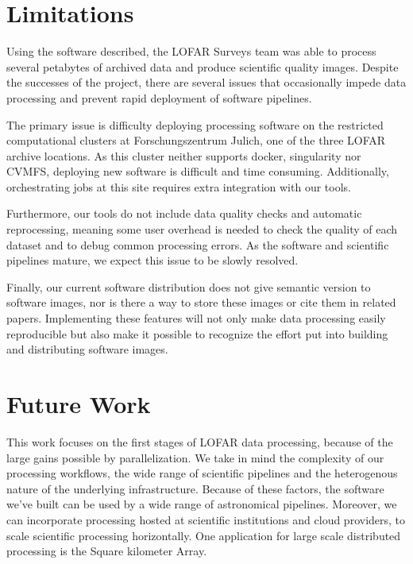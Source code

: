\section{Limitations}

Using the software described, the LOFAR Surveys team was able to process several petabytes of archived data and produce scientific quality images. Despite the successes of the project, there are several issues that occasionally impede data processing and prevent rapid deployment of software pipelines.

The primary issue is difficulty deploying processing software on the restricted computational clusters at Forschungszentrum J{\:u}lich, one of the three LOFAR archive locations. As this cluster neither supports docker, singularity nor CVMFS, deploying new software is difficult and time consuming. Additionally, orchestrating jobs at this site requires extra integration with our tools.

Furthermore, our tools do not include data quality checks and automatic reprocessing, meaning some user overhead is needed to check the quality of each dataset and to debug common processing errors. As the software and scientific pipelines mature, we expect this issue to be slowly resolved.

Finally, our current software distribution does not give semantic version to software images, nor is there a way to store these images or cite them in related papers. Implementing these features will not only make data processing easily reproducible but also make it possible to recognize the effort put into building and distributing software images.


\section{Future Work}

This work focuses on the first stages of LOFAR data processing, because of the large gains possible by parallelization. We take in mind the complexity of our processing workflows, the wide range of scientific pipelines and the heterogenous nature of the underlying infrastructure. Because of these factors, the software we've built can be used by a wide range of astronomical pipelines. Moreover, we can incorporate processing hosted at scientific institutions and cloud providers, to scale scientific processing horizontally.  One application for large scale distributed processing is the Square kilometer Array. 

